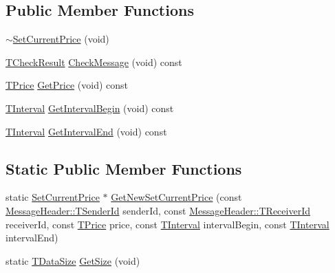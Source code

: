 \subsection*{Public Member Functions}
\begin{DoxyCompactItemize}
\item 
\hyperlink{class_terra_swarm_1_1_synchronous_1_1_set_current_price_ab9188b1b4eeed0a333ec879acac1cc30}{$\sim$\-Set\-Current\-Price} (void)
\item 
\hyperlink{class_terra_swarm_1_1_synchronous_1_1_set_current_price_aeed4ef4c867719626ede15e2f8718436}{T\-Check\-Result} \hyperlink{class_terra_swarm_1_1_synchronous_1_1_set_current_price_a01c2cf6549b92e8066d2f57b753ce8b2}{Check\-Message} (void) const 
\item 
\hyperlink{class_terra_swarm_1_1_synchronous_1_1_set_current_price_a2ed14f2a90070d19a70183bb63e7708e}{T\-Price} \hyperlink{class_terra_swarm_1_1_synchronous_1_1_set_current_price_aafd75de81420798be1243a02cd8ab7a2}{Get\-Price} (void) const 
\item 
\hyperlink{class_terra_swarm_1_1_synchronous_1_1_set_current_price_aa87902078a0788d13ef70b899d83f4d3}{T\-Interval} \hyperlink{class_terra_swarm_1_1_synchronous_1_1_set_current_price_a35a5775c7987c4b1882edfa730f36e7b}{Get\-Interval\-Begin} (void) const 
\item 
\hyperlink{class_terra_swarm_1_1_synchronous_1_1_set_current_price_aa87902078a0788d13ef70b899d83f4d3}{T\-Interval} \hyperlink{class_terra_swarm_1_1_synchronous_1_1_set_current_price_a267e167ab05f6dd602a202fcc5d7efdf}{Get\-Interval\-End} (void) const 
\end{DoxyCompactItemize}
\subsection*{Static Public Member Functions}
\begin{DoxyCompactItemize}
\item 
static \hyperlink{class_terra_swarm_1_1_synchronous_1_1_set_current_price}{Set\-Current\-Price} $\ast$ \hyperlink{class_terra_swarm_1_1_synchronous_1_1_set_current_price_a4f796519e90280eb712adabec444493e}{Get\-New\-Set\-Current\-Price} (const \hyperlink{class_terra_swarm_1_1_message_header_a516b36855e2aad7cfbf8770f1b42784f}{Message\-Header\-::\-T\-Sender\-Id} sender\-Id, const \hyperlink{class_terra_swarm_1_1_message_header_aa3260702b182b6f88ddbdd3416e98df0}{Message\-Header\-::\-T\-Receiver\-Id} receiver\-Id, const \hyperlink{class_terra_swarm_1_1_synchronous_1_1_set_current_price_a2ed14f2a90070d19a70183bb63e7708e}{T\-Price} price, const \hyperlink{class_terra_swarm_1_1_synchronous_1_1_set_current_price_aa87902078a0788d13ef70b899d83f4d3}{T\-Interval} interval\-Begin, const \hyperlink{class_terra_swarm_1_1_synchronous_1_1_set_current_price_aa87902078a0788d13ef70b899d83f4d3}{T\-Interval} interval\-End)
\item 
static \hyperlink{namespace_terra_swarm_a092e6ec9739175076ae3106783f5c1b6}{T\-Data\-Size} \hyperlink{class_terra_swarm_1_1_synchronous_1_1_set_current_price_a32e1cebec60aa525dbb32025b4201b43}{Get\-Size} (void)
\end{DoxyCompactItemize}
